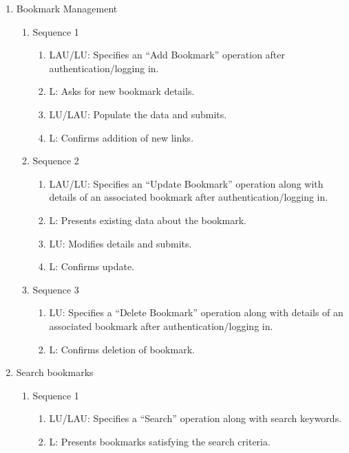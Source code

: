 \documentclass[11pt]{report} %
\begin{document}
\begin{enumerate}
\item
	Bookmark Management
		\begin{enumerate}
			\item
				Sequence 1
					\begin{enumerate}
						\item
							LAU/LU: Specifies an “Add Bookmark” operation after authentication/logging in.
						\item
							L: Asks for new bookmark details.
						\item
							LU/LAU: Populate the data and submits.
						\item
							L: Confirms addition of new links.
					\end{enumerate}
			\item
				Sequence 2
					\begin{enumerate}
						\item
							LAU/LU: Specifies an “Update Bookmark” operation along with details of an associated bookmark after authentication/logging in.
						\item
							L: Presents existing data about the bookmark.
						\item
							LU: Modifies details and submits.
						\item
							L: Confirms update.
					\end{enumerate}
			\item
				Sequence 3
					\begin{enumerate}
						\item
							LU: Specifies a “Delete Bookmark” operation along with details of an associated bookmark after authentication/logging in.
						\item
							L: Confirms deletion of bookmark.
					\end{enumerate}
		\end{enumerate}

\item
	Search bookmarks
		\begin{enumerate}
			\item
				Sequence 1
					\begin{enumerate}
						\item
							LU/LAU: Specifies a “Search” operation along with search keywords.
						\item
							L: Presents bookmarks satisfying the search criteria.				
					\end{enumerate}			
		\end{enumerate}



\end{enumerate}
\end{document}
